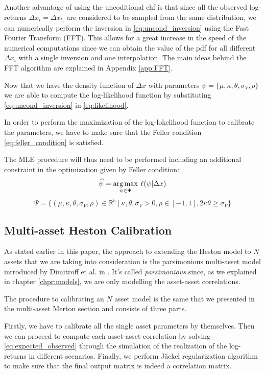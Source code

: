 Another advantage of using the uncoditional chf is that since all the observed log-returns $\Delta x_i = \Delta x_{t_i} $ are considered to be sampled from the same distribution, we can numerically perform the inversion in \eqref{eq:uncond_inversion} using the Fast Fourier Transform (FFT). This allows for a great increase in the speed of the numerical computations since we can obtain the value of the pdf for all different $\Delta x_i$ with a single inversion and one interpolation.
The main ideas behind the FFT algorithm are explained in Appendix \ref{app:FFT}.


Now that we have the density function of $\Delta x$ with parameters $\psi = \{\mu, \kappa, \theta, \sigma_V, \rho \}$ we are able to compute the log-likelihood function by substituting \eqref{eq:uncond_inversion} in \eqref{eq:likelihood}.


In order to perform the maximization of the log-lokelihood function to calibrate the parameters, we have to make sure that the Feller condition \eqref{eq:feller_condition} is satisfied.

The MLE procedure will thus need to be performed including an additional constraint in the optimization given by Feller condition:
\begin{equation}
\widehat{\psi} = \operatorname*{arg\,max}_{\psi \in \Psi} \:\ell(\psi |  \Delta x)
\end{equation}
\begin{equation}
	\Psi = \{ (\mu, \kappa, \theta, \sigma_V, \rho) \in \mathbb{R}^5 \: |\: \kappa,\theta,\sigma_V >0, \rho \in [-1,1], 2\kappa\theta \geq \sigma_V \}
\end{equation}



\subsection{Multi-asset Heston Calibration}
\label{sec:multi_heston_cal}
As stated earlier in this paper, the approach to extending the Heston model to $N$ assets that we are taking into consideration is the parsimonious multi-asset model introduced by Dimitroff et al. in \citep{PARSIMONIOUS2011}.
It's called \textit{parsimonious} since, as we explained in chapter \ref{chpr:models}, we are only modelling the asset-asset correlations.

The procedure to calibrating an $N$ asset model is the same that we presented in the multi-asset Merton section and consists of three parts.

Firstly, we have to calibrate all the single asset parameters by themselves. Then we can proceed to compute each asset-asset correlation by solving \eqref{eq:expected_observed} through the simulation of the realization of the log-returns in different scenarios.
Finally, we perform J\"ackel regularization algorithm to make sure that the final output matrix is indeed a correlation matrix.

